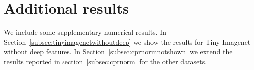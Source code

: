 \documentclass{article} \usepackage{iclr2020_conference,times}
\def\secref#1{section~\ref{#1}}
\def\Secref#1{Section~\ref{#1}}
\begin{document}
\begin{table}[th]
\centering
\caption{Runtime comparison: runtimes (in seconds) are reported for all methods and datasets in \Secref{subsec:res}, where the outlier ratio is .
Since  GT was only applied to the image datasets without deep features, its runtime is not available (N/A) for the last three datasets.
}
\label{tab:runtime}

\end{table}


\section{Additional results}

We include some supplementary numerical results. In \Secref{subsec:tinyimagenetwithoutdeep} we show the results for Tiny Imagenet without deep features. In \Secref{subsec:cprnormnotshown} we extend the results reported in \secref{subsec:cprnorm} for the other datasets.
\end{document}
